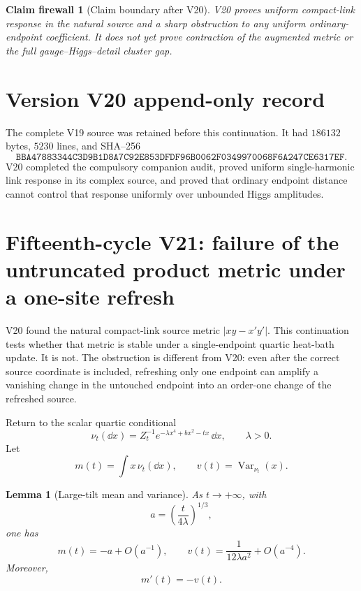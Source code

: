 \documentclass[11pt]{article}
\newtheorem{lemma}[theorem]{Lemma}
\newtheorem{firewall}[theorem]{Claim firewall}
\theoremstyle{remark}
\begin{document}
\begin{firewall}[Claim boundary after V20]
\label{fire:v15v20}
V20 proves uniform compact-link response in the natural source and
a sharp obstruction to any uniform ordinary-endpoint coefficient.
It does not yet prove contraction of the augmented metric or the
full gauge--Higgs--detail cluster gap.
\end{firewall}

\section*{Version V20 append-only record}
The complete V19 source was retained before this continuation.  It
had \(186132\) bytes, \(5230\) lines, and SHA--256
\[
 \texttt{BBA47883344C3D9B1D8A7C92E853DFDF96B0062F0349970068F6A247CE6317EF}.
\]
V20 completed the compulsory companion audit, proved uniform
single-harmonic link response in its complex source, and proved
that ordinary endpoint distance cannot control that response
uniformly over unbounded Higgs amplitudes.
\section{Fifteenth-cycle V21: failure of the untruncated product metric under a one-site refresh}
\label{sec:v15v21}

V20 found the natural compact-link source metric
\(|xy-x'y'|\).  This continuation tests whether that metric is
stable under a single-endpoint quartic heat-bath update.  It is not.
The obstruction is different from V20: even after the correct source
coordinate is included, refreshing only one endpoint can amplify a
vanishing change in the untouched endpoint into an order-one change
of the refreshed source.

Return to the scalar quartic conditional
\[
 \nu_t(\dd x)
 =
 Z_t^{-1}e^{-\lambda x^4+bx^2-tx}\,\dd x,
 \qquad\lambda>0.                                           \tag{21.1}
\]
Let
\[
 m(t)=\int x\,\nu_t(\dd x),\qquad
 v(t)=\operatorname{Var}_{\nu_t}(x).                        \tag{21.2}
\]

\begin{lemma}[Large-tilt mean and variance]
\label{lem:v15v21-laplace}
As \(t\to+\infty\), with
\[
 a=\left(\frac{t}{4\lambda}\right)^{1/3},
\]
one has
\[
 m(t)=-a+O(a^{-1}),\qquad
 v(t)=\frac{1}{12\lambda a^2}+O(a^{-4}).                    \tag{21.3}
\]
Moreover,
\[
 m'(t)=-v(t).                                               \tag{21.4}
\]
\end{lemma}
\end{document}
